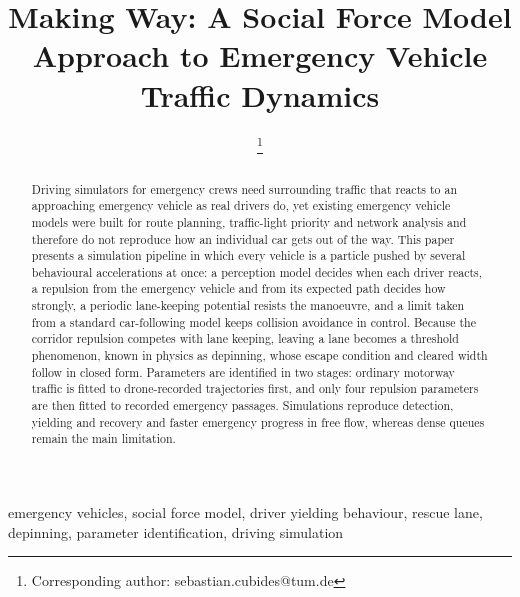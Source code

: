 \documentclass[conference,a4paper]{IEEEtran}
\begin{document}
\title{Making Way: A Social Force Model Approach to Emergency Vehicle Traffic Dynamics}

\author{\thanks{Corresponding author: sebastian.cubides@tum.de}%
\and
{}
}

\maketitle

\begin{abstract}
Driving simulators for emergency crews need surrounding traffic that reacts to an approaching emergency vehicle as real drivers do, yet existing emergency vehicle models were built for route planning, traffic-light priority and network analysis and therefore do not reproduce how an individual car gets out of the way. This paper presents a simulation pipeline in which every vehicle is a particle pushed by several behavioural accelerations at once: a perception model decides when each driver reacts, a repulsion from the emergency vehicle and from its expected path decides how strongly, a periodic lane-keeping potential resists the manoeuvre, and a limit taken from a standard car-following model keeps collision avoidance in control. Because the corridor repulsion competes with lane keeping, leaving a lane becomes a threshold phenomenon, known in physics as depinning, whose escape condition and cleared width follow in closed form. Parameters are identified in two stages: ordinary motorway traffic is fitted to drone-recorded trajectories first, and only four repulsion parameters are then fitted to recorded emergency passages. Simulations reproduce detection, yielding and recovery and faster emergency progress in free flow, whereas dense queues remain the main limitation.
\end{abstract}

\begin{IEEEkeywords}
emergency vehicles, social force model, driver yielding behaviour, rescue lane, depinning, parameter identification, driving simulation
\end{IEEEkeywords}
\end{document}
